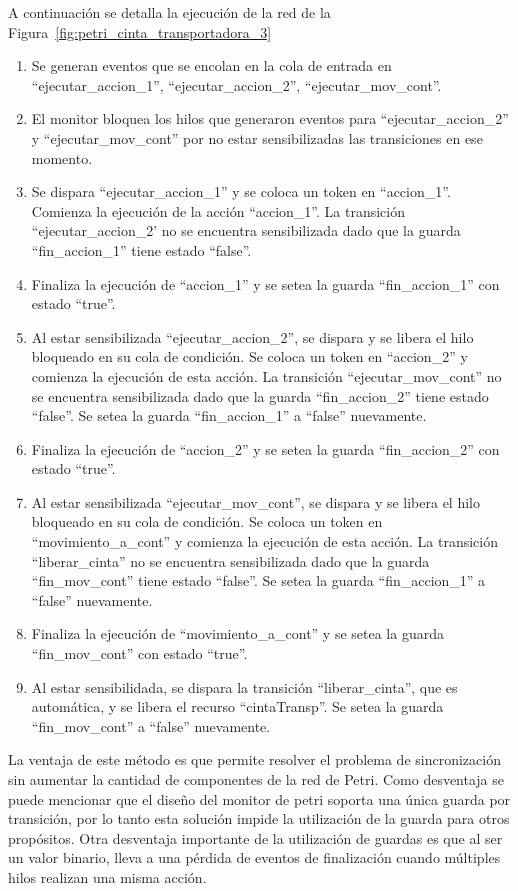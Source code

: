 A continuación se detalla la ejecución de la red de la
Figura~\ref{fig:petri_cinta_transportadora_3}
\begin{enumerate}
    \item Se generan eventos que se encolan en la cola de entrada en
    ``ejecutar\_accion\_1'', ``ejecutar\_accion\_2'', ``ejecutar\_mov\_cont''.
	\item El monitor bloquea los hilos que generaron eventos para
	``ejecutar\_accion\_2'' y ``ejecutar\_mov\_cont'' por no estar sensibilizadas
	las transiciones en ese momento.
	\item Se dispara ``ejecutar\_accion\_1'' y se coloca un token en ``accion\_1''.
	Comienza la ejecución de la acción ``accion\_1''. La transición
	``ejecutar\_accion\_2' no se encuentra sensibilizada dado que la guarda
	``fin\_accion\_1'' tiene estado ``false''.
	\item Finaliza la ejecución de ``accion\_1'' y se setea la guarda
	``fin\_accion\_1'' con estado ``true''.
	\item Al estar sensibilizada ``ejecutar\_accion\_2'', se dispara y se libera el hilo
	bloqueado en su cola de condición. Se coloca un token en ``accion\_2'' y
	comienza la ejecución de esta acción. La transición ``ejecutar\_mov\_cont'' no
	se encuentra sensibilizada dado que la guarda ``fin\_accion\_2'' tiene estado
	``false''.
	Se setea la guarda ``fin\_accion\_1'' a ``false'' nuevamente.
	\item Finaliza la ejecución de ``accion\_2'' y se setea la guarda
	``fin\_accion\_2'' con estado ``true''.
	\item Al estar sensibilizada ``ejecutar\_mov\_cont'', se dispara y se libera
	el hilo bloqueado en su cola de condición. Se coloca un token en
	``movimiento\_a\_cont'' y comienza la ejecución de esta acción. La transición
	``liberar\_cinta'' no se encuentra sensibilizada dado que la guarda
	``fin\_mov\_cont'' tiene estado ``false''.
	Se setea la guarda ``fin\_accion\_1'' a ``false'' nuevamente.
	\item Finaliza la ejecución de ``movimiento\_a\_cont'' y se setea la guarda
	``fin\_mov\_cont'' con estado ``true''.
	\item Al estar sensibilidada, se dispara la transición ``liberar\_cinta'', que es
	automática, y se libera el recurso ``cintaTransp''. Se setea la guarda
	``fin\_mov\_cont'' a ``false'' nuevamente.
\end{enumerate}

La ventaja de este método es que permite resolver el problema de sincronización
sin aumentar la cantidad de componentes de la red de Petri.
Como desventaja se puede mencionar que el diseño
del monitor de petri soporta una única guarda por transición, por lo tanto esta
solución impide la utilización de la guarda para otros propósitos. Otra
desventaja importante de la utilización de guardas es que al ser un valor
binario, lleva a una pérdida de eventos de finalización cuando
múltiples hilos realizan una misma acción.

